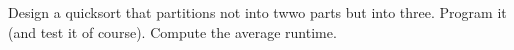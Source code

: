   Design a quicksort that partitions not into twwo parts but into three.
  Program it (and test it of course).
  Compute the average runtime.
